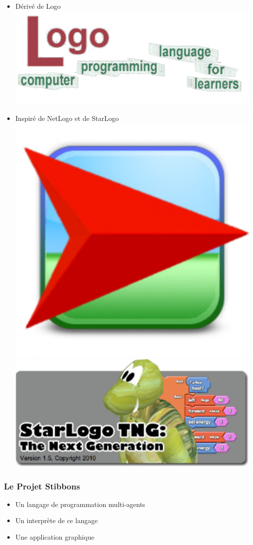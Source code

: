 \begin{frame}
\begin{itemize}
	\item Dérivé de Logo
		\includegraphics[scale=0.4]{doc/Presentation/image/logo.pdf}
	\item Inspiré de NetLogo et de StarLogo
		\includegraphics[scale=0.3]{doc/Presentation/image/netlogo.pdf}
		\includegraphics[scale=0.4]{doc/Presentation/image/starlogo.pdf}
\end{itemize}
\end{frame}

\begin{frame}
\frametitle{Le Projet Stibbons}
\begin{itemize}
	\item Un langage de programmation multi-agents
	\item Un interprète de ce langage
	\item Une application graphique
\end{itemize}
\end{frame}
